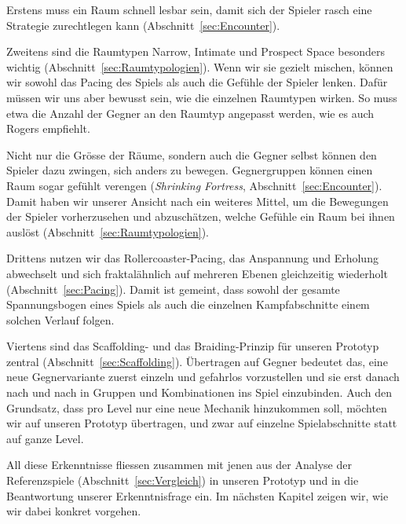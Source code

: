 \documentclass[../Main.tex]{subfiles}
\begin{document}
Erstens muss ein Raum schnell lesbar sein, damit sich der Spieler rasch eine Strategie zurechtlegen kann (Abschnitt~\ref{sec:Encounter}).

Zweitens sind die Raumtypen Narrow, Intimate und Prospect Space besonders wichtig (Abschnitt~\ref{sec:Raumtypologien}). Wenn wir sie gezielt mischen, können wir sowohl das Pacing des Spiels als auch die Gefühle der Spieler lenken. Dafür müssen wir uns aber bewusst sein, wie die einzelnen Raumtypen wirken. So muss etwa die Anzahl der Gegner an den Raumtyp angepasst werden, wie es auch Rogers empfiehlt.\textcolor{red}{\autocite[245]{rogers2014levelup}}

Nicht nur die Grösse der Räume, sondern auch die Gegner selbst können den Spieler dazu zwingen, sich anders zu bewegen. Gegnergruppen können einen Raum sogar gefühlt verengen (\textit{Shrinking Fortress}, Abschnitt~\ref{sec:Encounter}). Damit haben wir unserer Ansicht nach ein weiteres Mittel, um die Bewegungen der Spieler vorherzusehen und abzuschätzen, welche Gefühle ein Raum bei ihnen auslöst (Abschnitt~\ref{sec:Raumtypologien}).

Drittens nutzen wir das Rollercoaster-Pacing, das Anspannung und Erholung abwechselt und sich fraktalähnlich auf mehreren Ebenen gleichzeitig wiederholt (Abschnitt~\ref{sec:Pacing}). Damit ist gemeint, dass sowohl der gesamte Spannungsbogen eines Spiels als auch die einzelnen Kampfabschnitte einem solchen Verlauf folgen.

Viertens sind das Scaffolding- und das Braiding-Prinzip für unseren Prototyp zentral (Abschnitt~\ref{sec:Scaffolding}). Übertragen auf Gegner bedeutet das, eine neue Gegnervariante zuerst einzeln und gefahrlos vorzustellen und sie erst danach nach und nach in Gruppen und Kombinationen ins Spiel einzubinden. Auch den Grundsatz, dass pro Level nur eine neue Mechanik hinzukommen soll, möchten wir auf unseren Prototyp übertragen, und zwar auf einzelne Spielabschnitte statt auf ganze Level.

All diese Erkenntnisse fliessen zusammen mit jenen aus der Analyse der Referenzspiele (Abschnitt~\ref{sec:Vergleich}) in unseren Prototyp und in die Beantwortung unserer Erkenntnisfrage ein. Im nächsten Kapitel zeigen wir, wie wir dabei konkret vorgehen.
\end{document}
